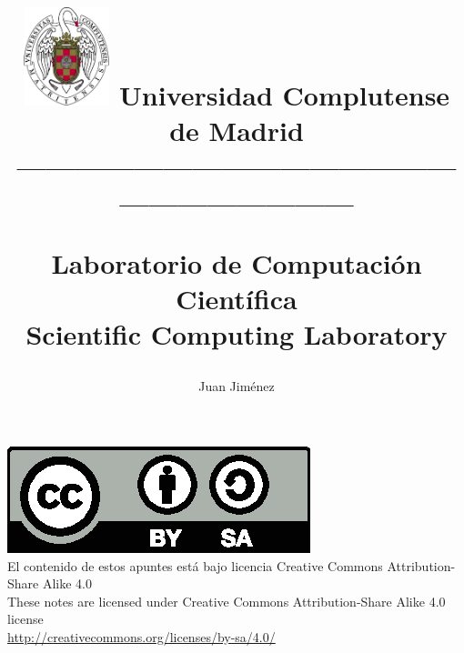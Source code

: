 \documentclass[a4paper,10pt]{book}
\begin{document}
\title{
\begin{flushleft}
\includegraphics[width=2.5cm]{ucm2.pdf} 
Universidad Complutense de Madrid\\
---------------------------------------------------------------------
\end{flushleft}
Laboratorio de Computación Científica\\ Scientific Computing Laboratory}
\author{ Juan Jim\'enez\\}
\maketitle
\vspace*{\fill}
\includegraphics[scale=1]{by-sa.eps}\\
El contenido de estos apuntes está bajo licencia Creative Commons Attribution-Share Alike 4.0\\
These notes are licensed under Creative Commons Attribution-Share Alike 4.0 license\\  
\href{http://creativecommons.org/licenses/by-sa/4.0/}{http://creativecommons.org/licenses/by-sa/4.0/}\\

\bigskip
\tableofcontents
\listoffigures
\listoftables



%
%
%
%
%
%
%
%
\printindex
\end{document}
